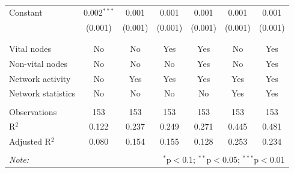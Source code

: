 \begin{table}[!htbp]
\begin{tabular}{@{\extracolsep{5pt}}lcccccc}
 Constant & 0.002$^{***}$ & 0.001 & 0.001 & 0.001 & 0.001 & 0.001 \\ 
  & (0.001) & (0.001) & (0.001) & (0.001) & (0.001) & (0.001) \\ 
  & & & & & & \\ 
\hline \\[-1.8ex] 
Vital nodes & No & No & Yes & Yes & No & Yes \\ 
Non-vital nodes & No & No & No & Yes & No & Yes \\ 
Network activity & No & Yes & Yes & Yes & Yes & Yes \\ 
Network statistics & No & No & No & No & Yes & Yes \\ 
\hline &  &  &  &  &  &  \\ 
Observations & 153 & 153 & 153 & 153 & 153 & 153 \\ 
R$^{2}$ & 0.122 & 0.237 & 0.249 & 0.271 & 0.445 & 0.481 \\ 
Adjusted R$^{2}$ & 0.080 & 0.154 & 0.155 & 0.128 & 0.253 & 0.234 \\ 
\hline 
\hline \\[-1.8ex] 
\textit{Note:}  & \multicolumn{6}{r}{$^{*}$p$<$0.1; $^{**}$p$<$0.05; $^{***}$p$<$0.01} \\ 
\end{tabular} 
\end{table} 
